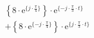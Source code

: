 \[
\begin{split}
&   \left \{ 8 \cdot \textrm{e}^{\{  j \cdot \frac{\pi}{4} \}} \right \} \cdot \textrm{e}^{\{- j \cdot \frac{\pi}{3} \cdot t \}}\\
&+  \left \{ 8 \cdot \textrm{e}^{\{ -j \cdot \frac{\pi}{4} \}} \right \} \cdot \textrm{e}^{\{  j \cdot \frac{\pi}{3} \cdot t \}}\\
\end{split}
\]
